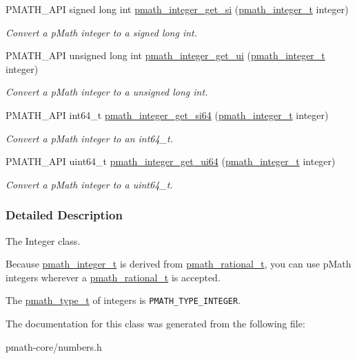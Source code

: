 \begin{CompactItemize}
PMATH\_\-API signed long int \hyperlink{group__numbers_g12219f6f678ed0ddff66d352e0dabbd1}{pmath\_\-integer\_\-get\_\-si} (\hyperlink{classpmath__integer__t}{pmath\_\-integer\_\-t} integer)
\begin{CompactList}\small\item\em Convert a pMath integer to a signed long int. \item\end{CompactList}\item 
PMATH\_\-API unsigned long int \hyperlink{group__numbers_g0aed3b6f38410b7e42ffa52be73c6ea6}{pmath\_\-integer\_\-get\_\-ui} (\hyperlink{classpmath__integer__t}{pmath\_\-integer\_\-t} integer)
\begin{CompactList}\small\item\em Convert a pMath integer to a unsigned long int. \item\end{CompactList}\item 
PMATH\_\-API int64\_\-t \hyperlink{group__numbers_g95e554207096c722e5be03f538ff7eae}{pmath\_\-integer\_\-get\_\-si64} (\hyperlink{classpmath__integer__t}{pmath\_\-integer\_\-t} integer)
\begin{CompactList}\small\item\em Convert a pMath integer to an int64\_\-t. \item\end{CompactList}\item 
PMATH\_\-API uint64\_\-t \hyperlink{group__numbers_ged9add974a0fd79a3ecfb91e51280e96}{pmath\_\-integer\_\-get\_\-ui64} (\hyperlink{classpmath__integer__t}{pmath\_\-integer\_\-t} integer)
\begin{CompactList}\small\item\em Convert a pMath integer to a uint64\_\-t. \item\end{CompactList}\end{CompactItemize}


\subsubsection{Detailed Description}
The Integer class. 

Because \hyperlink{classpmath__integer__t}{pmath\_\-integer\_\-t} is derived from \hyperlink{classpmath__rational__t}{pmath\_\-rational\_\-t}, you can use pMath integers wherever a \hyperlink{classpmath__rational__t}{pmath\_\-rational\_\-t} is accepted.

The \hyperlink{group__objects_ge2646df76dcb0113715322b13a1f36f0}{pmath\_\-type\_\-t} of integers is {\tt PMATH\_\-TYPE\_\-INTEGER}. 

The documentation for this class was generated from the following file:\begin{CompactItemize}
\item 
pmath-core/numbers.h\end{CompactItemize}
